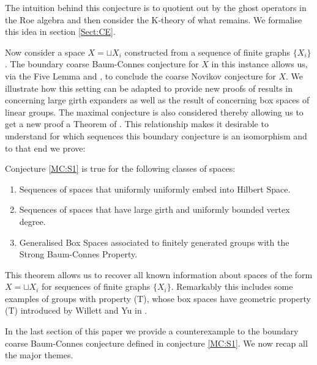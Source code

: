 The intuition behind this conjecture is to quotient out by the ghost operators in the Roe algebra and then consider the K-theory of what remains. We formalise this idea in section \ref{Sect:CE}.

Now consider a space $X = \sqcup X_{i}$ constructed from a sequence of finite graphs $\lbrace X_{i}\rbrace$. The boundary coarse Baum-Connes conjecture for $X$ in this instance allows us, via the Five Lemma and \cite[Lemma 9]{MR1905840}, to conclude the coarse Novikov conjecture for $X$. We illustrate how this setting can be adapted to provide new proofs of results in \cite{explg1} concerning large girth expanders as well as the result of \cite[Theorem 5.7]{MR2764895} concerning box spaces of linear groups. The maximal conjecture is also considered thereby allowing us to get a new proof a Theorem of \cite{MR2431253,MR2419930,MR2568691}. This relationship makes it desirable to understand for which sequences this boundary conjecture is an isomorphism and to that end we prove:

\begin{theorem}\label{MT:S1}
Conjecture \ref{MC:S1} is true for the following classes of spaces:
\begin{enumerate}
\item Sequences of spaces that uniformly uniformly embed into Hilbert Space. 
\item Sequences of spaces that have large girth and uniformly bounded vertex degree.
\item Generalised Box Spaces associated to finitely generated groups with the Strong Baum-Connes Property.
\end{enumerate}
\end{theorem}
This theorem allows us to recover all known information about spaces of the form $X = \sqcup X_{i}$ for sequences of finite graphs $\lbrace X_{i} \rbrace$. Remarkably this includes some examples of groups with property (T), whose box spaces have geometric property (T) introduced by Willett and Yu in \cite{explg2}.

In the last section of this paper we provide a counterexample to the boundary coarse Baum-Connes conjecture defined in conjecture \ref{MC:S1}. We now recap all the major themes.